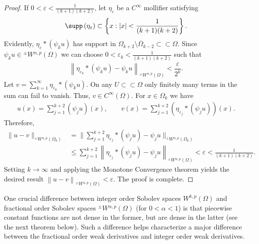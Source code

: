 \documentclass[leqno,final]{siamltex}
\numberwithin{equation}{section}
\newcommand{\eps}{\varepsilon}
\renewcommand{\(}{\bigl(}
\renewcommand{\)}{\bigr)}
\begin{document}
\begin{proof}
        If $ 0 < \eps < \frac{1}{(k+1)(k+2)}$, let $\eta_{\eps}$ be a $C^{\infty}$ mollifier satisfying
        \begin{align*}
            \supp \left( \eta_{\eps}\right) \subset \left\{x : |x| < \frac{1}{(k+1)(k+2)}\right\}.
        \end{align*}
        Evidently,  $\eta_{\eps} * \left( \psi_{k} u \right)$ has support in $\Omega_{k+2} \setminus \overline{\Omega}_{k-2} \subset \subset \Omega$. Since $\psi_{k} u \in {^{\pm}}{W}{^{\alpha,p}}(\Omega)$ we can choose $0 < \eps_{k} < \frac{1}{(k+1)(k+2)}$ such that 
        \begin{align*}
            \left\|\eta_{\eps_{k}} * (\psi_ku) - \psi_{k} u \right\|_{{^{\pm}}{W}{^{\alpha,p}}(\Omega)} < \dfrac{\eps}{2^{k}}.
        \end{align*}
        Let $v = \sum_{k=1}^{\infty} \eta_{\eps_{k}} * (\psi_{k} u)$. On any $U \subset \subset \Omega$ only finitely
         many terms in the sum can fail to vanish. Thus, $v \in C^{\infty}(\Omega)$. For $x \in \Omega_{k}$ we have 
        \begin{align*}
            u(x) = \sum_{j =1}^{k+2} (\psi_{j} u)(x), \qquad v(x) = \sum_{j=1}^{k+2} \left(\eta_{\eps_{j}} * (\psi_{j}u)\right)(x). 
        \end{align*}
        Therefore, 
        \begin{align*}
            \|u - v\|_{{^{\pm}}{W}{^{\alpha, p}}\left(\Omega_k\right)} &= \biggl\|\sum_{j=1}^{k+2} \eta_{\eps_j}*(\psi_{j}u) - \psi_{j} u \biggr\|_{{^{\pm}}{W}{^{\alpha , p}}(\Omega_{k})} \\
            &\leq \sum_{j=1}^{k+2} \left\|\eta_{\eps_j}* (\psi_{j}u) - \psi_{j} u \right\|_{{^{\pm}}{W}{^{\alpha , p}}(\Omega)} < \eps < \frac{1}{(k+1)(k+2)}.
        \end{align*}
        Setting $k \rightarrow \infty$ and applying the Monotone Convergence theorem yields the desired result 
        $\left\|u - v\right\|_{{^{\pm}}{W}{^{\alpha,p}}(\Omega)} < \eps$. The proof is complete.
    \end{proof}
    
    One crucial difference between integer order Sobolev spaces $W^{k,p}(\Omega)$ and fractional order Sobolev spaces $^{{\pm}}{W}{^{\alpha,p}}(\Omega)$ (for $0<\alpha<1$) is that
    piecewise constant functions are not dense in the former, but are dense in the latter  
    (see the next theorem below). 
    Such a difference helps characterize a major difference between the fractional order weak derivatives and 
    integer order weak derivatives.
    
\end{document}
